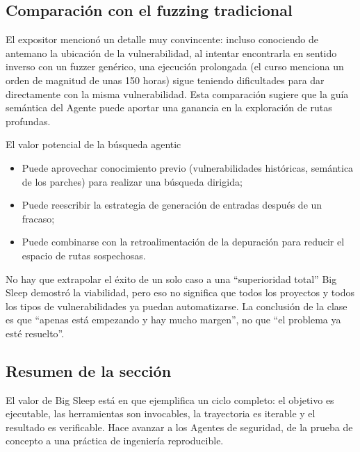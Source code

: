 \subsection{Comparación con el fuzzing tradicional}
El expositor mencionó un detalle muy convincente: incluso conociendo de antemano la ubicación de la vulnerabilidad, al intentar encontrarla en sentido inverso con un fuzzer genérico, una ejecución prolongada (el curso menciona un orden de magnitud de unas 150 horas) sigue teniendo dificultades para dar directamente con la misma vulnerabilidad. Esta comparación sugiere que la guía semántica del Agente puede aportar una ganancia en la exploración de rutas profundas.

\begin{knowledgebox}{El valor potencial de la búsqueda agentic}
\begin{itemize}
    \item Puede aprovechar conocimiento previo (vulnerabilidades históricas, semántica de los parches) para realizar una búsqueda dirigida;
    \item Puede reescribir la estrategia de generación de entradas después de un fracaso;
    \item Puede combinarse con la retroalimentación de la depuración para reducir el espacio de rutas sospechosas.
\end{itemize}
\end{knowledgebox}

\begin{warningbox}{No hay que extrapolar el éxito de un solo caso a una ``superioridad total''}
Big Sleep demostró la viabilidad, pero eso no significa que todos los proyectos y todos los tipos de vulnerabilidades ya puedan automatizarse. La conclusión de la clase es que ``apenas está empezando y hay mucho margen'', no que ``el problema ya esté resuelto''.
\end{warningbox}

\subsection{Resumen de la sección}
El valor de Big Sleep está en que ejemplifica un ciclo completo: el objetivo es ejecutable, las herramientas son invocables, la trayectoria es iterable y el resultado es verificable. Hace avanzar a los Agentes de seguridad, de la prueba de concepto a una práctica de ingeniería reproducible.
